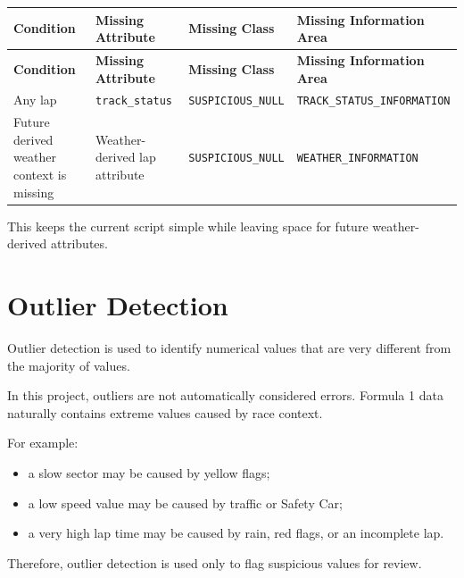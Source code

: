 \documentclass[a4paper,11pt]{article}
\begin{document}
	\begin{longtable}{p{4.5cm}p{4cm}p{3.5cm}p{4cm}}
		\toprule
		\textbf{Condition} & \textbf{Missing Attribute} & \textbf{Missing Class} & \textbf{Missing Information Area} \\
		\midrule
		\endfirsthead
		
		\toprule
		\textbf{Condition} & \textbf{Missing Attribute} & \textbf{Missing Class} & \textbf{Missing Information Area} \\
		\midrule
		\endhead
		
		Any lap
		& \texttt{track\_status}
		& \texttt{SUSPICIOUS\_NULL}
		& \texttt{TRACK\_STATUS\_INFORMATION} \\
		\midrule
		
		Future derived weather context is missing
		& Weather-derived lap attribute
		& \texttt{SUSPICIOUS\_NULL}
		& \texttt{WEATHER\_INFORMATION} \\
		\bottomrule
	\end{longtable}
	
	This keeps the current script simple while leaving space for future weather-derived attributes.
	

	\section{Outlier Detection}
	
	Outlier detection is used to identify numerical values that are very different from the majority of values.
	
	In this project, outliers are not automatically considered errors.
	Formula 1 data naturally contains extreme values caused by race context.
	
	For example:
	
	\begin{itemize}[leftmargin=1.2cm]
		\item a slow sector may be caused by yellow flags;
		\item a low speed value may be caused by traffic or Safety Car;
		\item a very high lap time may be caused by rain, red flags, or an incomplete lap.
	\end{itemize}
	
	Therefore, outlier detection is used only to flag suspicious values for review.
	
\end{document}
